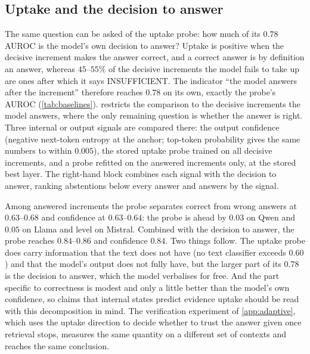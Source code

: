 \subsection{Uptake and the decision to answer}
\label{app:uptake-answer}
The same question can be asked of the uptake probe: how much of its $0.78$ AUROC is the model's own decision to answer? Uptake is positive when the decisive increment makes the answer correct, and a correct answer is by definition an answer, whereas $45$--$55\%$ of the decisive increments the model fails to take up are ones after which it says INSUFFICIENT. The indicator ``the model answers after the increment'' therefore reaches $0.78$ on its own, exactly the probe's AUROC (\cref{tab:baselines}).  restricts the comparison to the decisive increments the model answers, where the only remaining question is whether the answer is right. Three internal or output signals are compared there: the output confidence (negative next-token entropy at the anchor; top-token probability gives the same numbers to within $0.005$), the stored uptake probe trained on all decisive increments, and a probe refitted on the answered increments only, at the stored best layer. The right-hand block combines each signal with the decision to answer, ranking abstentions below every answer and answers by the signal.

\begin{table}[t]
\centering\small

\caption{Uptake among the decisive increments the model answers (document split, test questions). $n$: answered test increments; ``correct'': fraction correct among them. Left: AUROC for correct against wrong answers of output confidence, of the uptake probe trained on all decisive increments, and of a probe refitted on answered increments. Right: AUROC on all decisive increments of the decision to answer alone and combined with confidence or with the refitted probe.}
\label{tab:uptake_given}
\end{table}

Among answered increments the probe separates correct from wrong answers at $0.63$--$0.68$ and confidence at $0.63$--$0.64$: the probe is ahead by $0.03$ on Qwen and $0.05$ on Llama and level on Mistral. Combined with the decision to answer, the probe reaches $0.84$--$0.86$ and confidence $0.84$. Two things follow. The uptake probe does carry information that the text does not have (no text classifier exceeds $0.60$) and that the model's output does not fully have, but the larger part of its $0.78$ is the decision to answer, which the model verbalises for free. And the part specific to correctness is modest and only a little better than the model's own confidence, so claims that internal states predict evidence uptake should be read with this decomposition in mind. The verification experiment of \cref{app:adaptive}, which uses the uptake direction to decide whether to trust the answer given once retrieval stops, measures the same quantity on a different set of contexts and reaches the same conclusion.
